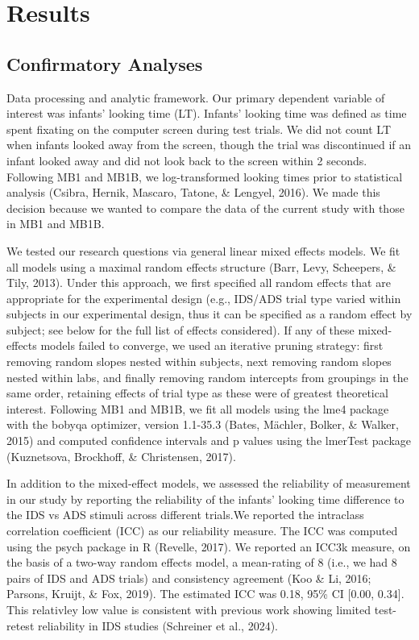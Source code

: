 \documentclass[
  english,
  ,man,floatsintext]{apa6}
\begin{document}
\section{Results}\label{results}

\subsection{Confirmatory Analyses}\label{confirmatory-analyses}

Data processing and analytic framework. Our primary dependent variable of interest was infants' looking time (LT). Infants' looking time was defined as time spent fixating on the computer screen during test trials. We did not count LT when infants looked away from the screen, though the trial was discontinued if an infant looked away and did not look back to the screen within 2 seconds. Following MB1 and MB1B, we log-transformed looking times prior to statistical analysis (Csibra, Hernik, Mascaro, Tatone, \& Lengyel, 2016). We made this decision because we wanted to compare the data of the current study with those in MB1 and MB1B.

We tested our research questions via general linear mixed effects models. We fit all models using a maximal random effects structure (Barr, Levy, Scheepers, \& Tily, 2013). Under this approach, we first specified all random effects that are appropriate for the experimental design (e.g., IDS/ADS trial type varied within subjects in our experimental design, thus it can be specified as a random effect by subject; see below for the full list of effects considered). If any of these mixed-effects models failed to converge, we used an iterative pruning strategy: first removing random slopes nested within subjects, next removing random slopes nested within labs, and finally removing random intercepts from groupings in the same order, retaining effects of trial type as these were of greatest theoretical interest. Following MB1 and MB1B, we fit all models using the lme4 package with the bobyqa optimizer, version 1.1-35.3 (Bates, Mächler, Bolker, \& Walker, 2015) and computed confidence intervals and p values using the lmerTest package (Kuznetsova, Brockhoff, \& Christensen, 2017).

In addition to the mixed-effect models, we assessed the reliability of measurement in our study by reporting the reliability of the infants' looking time difference to the IDS vs ADS stimuli across different trials.We reported the intraclass correlation coefficient (ICC) as our reliability measure. The ICC was computed using the psych package in R (Revelle, 2017). We reported an ICC3k measure, on the basis of a two-way random effects model, a mean-rating of 8 (i.e., we had 8 pairs of IDS and ADS trials) and consistency agreement (Koo \& Li, 2016; Parsons, Kruijt, \& Fox, 2019). The estimated ICC was 0.18, 95\% CI {[}0.00, 0.34{]}. This relativley low value is consistent with previous work showing limited test-retest reliability in IDS studies (Schreiner et al., 2024).
\end{document}
